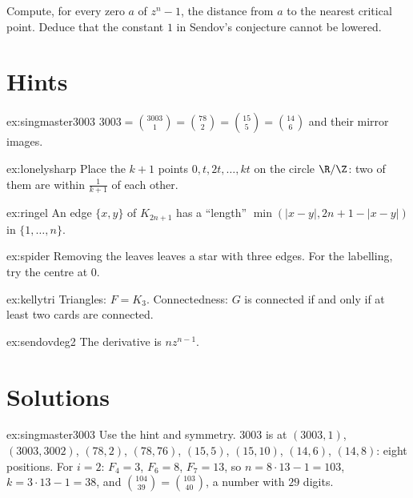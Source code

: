 \begin{exercise}[$\star$]\label{ex:sendovdeg2}
Compute, for every zero $a$ of $z^n-1$, the distance from $a$ to the nearest critical point. Deduce that the constant $1$ in Sendov's conjecture cannot be lowered.
\end{exercise}

\section{Hints}

\begin{hint}{ex:singmaster3003}
$3003=\binom{3003}1=\binom{78}2=\binom{15}5=\binom{14}6$ and their mirror images.
\end{hint}

\begin{hint}{ex:lonelysharp}
Place the $k+1$ points $0,t,2t,\dots,kt$ on the circle $\R/\Z$: two of them are within $\frac1{k+1}$ of each other.
\end{hint}

\begin{hint}{ex:ringel}
An edge $\{x,y\}$ of $K_{2n+1}$ has a ``length'' $\min(|x-y|,2n+1-|x-y|)$ in $\{1,\dots,n\}$.
\end{hint}

\begin{hint}{ex:spider}
Removing the leaves leaves a star with three edges. For the labelling, try the centre at $0$.
\end{hint}

\begin{hint}{ex:kellytri}
Triangles: $F=K_3$. Connectedness: $G$ is connected if and only if at least two cards are connected.
\end{hint}

\begin{hint}{ex:sendovdeg2}
The derivative is $nz^{n-1}$.
\end{hint}

\section{Solutions}

\begin{solution}{ex:singmaster3003}
\idea Use the hint and symmetry.
\writeup $3003$ is at $(3003,1)$, $(3003,3002)$, $(78,2)$, $(78,76)$, $(15,5)$, $(15,10)$, $(14,6)$, $(14,8)$: eight positions. For $i=2$: $F_4=3$, $F_6=8$, $F_7=13$, so $n=8\cdot13-1=103$, $k=3\cdot13-1=38$, and $\binom{104}{39}=\binom{103}{40}$, a number with $29$ digits.
\end{solution}

